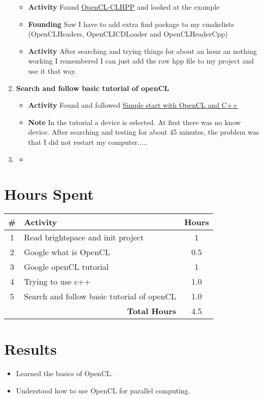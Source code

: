 \documentclass{article}
\begin{document}
\begin{enumerate}
    \begin{itemize}
        \item \textbf{Activity} Found \href{https://github.com/KhronosGroup/OpenCL-CLHPP}{OpenCL-CLHPP} and looked at the example
        \item \textbf{Founding} Saw I have to add extra find package to my cmakelists (OpenCLHeaders, OpenCLICDLoader and OpenCLHeaderCpp)
        \item \textbf{Activity} After searching and trying things for about an hour an nothing working I remembered I can just add the raw hpp file to my project and use it that way.
    \end{itemize}
    \item \textbf{Search and follow basic tutorial of openCL}
    \begin{itemize}
        \item \textbf{Activity} Found and followed \href{https://programmerclick.com/article/47811146604/}{Simple start with OpenCL and C++}
        \item \textbf{Note} In the tutorial a device is selected. At first there was no know device. After searching and testing for about 45 minutes, the problem was that I did not restart my computer.....
    \end{itemize}
    \item \textbf{}
    \begin{itemize}
        \item \textbf{}
    \end{itemize}
\end{enumerate}

\section*{Hours Spent}
\begin{tabular}{|c|l|c|}
    \hline
    \# & Activity & Hours \\
    \hline
    1 & Read brightspace and init project & 1 \\
    2 & Google what is OpenCL & 0.5 \\
    3 & Google openCL tutorial & 1 \\
    4 & Trying to use c++ & 1.0 \\
    5 & Search and follow basic tutorial of openCL & 1.0 \\
    \hline
    \multicolumn{2}{|r|}{\textbf{Total Hours}} & 4.5 \\
    \hline
\end{tabular}

\section*{Results}
\begin{itemize}
    \item Learned the basics of OpenCL.
    \item Understood how to use OpenCL for parallel computing.
\end{itemize}
\end{document}
